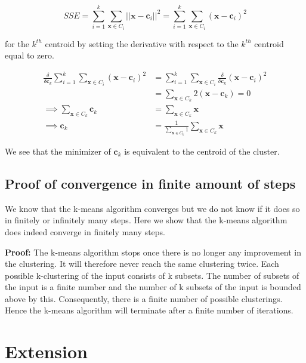 \documentclass[11pt]{article}
\begin{document}
    \begin{equation}
        SSE = \sum_{i=1}^k \sum_{\mathbf{x} \in C_i} ||\mathbf{x} - \mathbf{c}_i||^2 
        = \sum_{i=1}^k \sum_{\mathbf{x} \in C_i} (\mathbf{x} - \mathbf{c}_i)^2
    \end{equation}
    
    for the $k^{th}$ centroid by setting the derivative with respect to the $k^{th}$ centroid equal to zero.
    
    \begin{equation}
    \begin{split}
        \frac{\delta}{\delta \mathbf{c}_k} \sum_{i=1}^k \sum_{\mathbf{x} \in C_i} (\mathbf{x} - \mathbf{c}_i)^2
        &= \sum_{i=1}^k \sum_{\mathbf{x} \in C_i}  \frac{\delta}{\delta \mathbf{c}_k} (\mathbf{x} - \mathbf{c}_i)^2\\
        &= \sum_{\mathbf{x} \in C_k} 2(\mathbf{x} - \mathbf{c}_k) = 0\\
        \implies \sum_{\mathbf{x} \in C_k} \mathbf{c}_k &= \sum_{\mathbf{x} \in C_k} \mathbf{x}\\
        \implies \mathbf{c}_k &= \frac{1}{\sum_{\mathbf{x} \in C_k} 1} \sum_{\mathbf{x} \in C_k} \mathbf{x}
    \end{split}
    \end{equation}
    
    We see that the minimizer of $\mathbf{c}_k$ is equivalent to the centroid of the cluster.
    
\subsection{Proof of convergence in finite amount of steps}
    We know that the k-means algorithm converges but we do not know if it does so in finitely or infinitely many steps. Here we show that the k-means algorithm does indeed converge in finitely many steps.
    \par \textbf{Proof:} The k-means algorithm stops once there is no longer any improvement in the clustering. It will therefore never reach the same clustering twice. Each possible k-clustering of the input consists of k subsets. The number of subsets of the input is a finite number and the number of k subsets of the input is bounded above by this. Consequently, there is a finite number of possible clusterings. Hence the k-means algorithm will terminate after a finite number of iterations.
\section{Extension}
\end{document}

